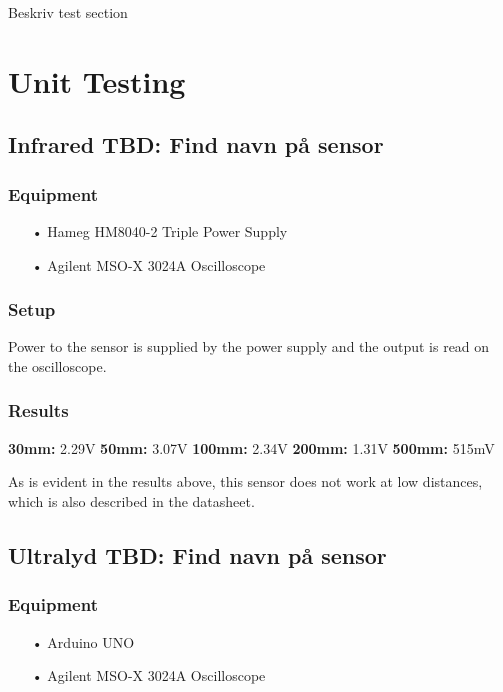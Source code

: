 Beskriv test section

\section{Unit Testing}

\subsection{Infrared TBD: Find navn på sensor}


\subsubsection{Equipment}
\begin{enumerate}
    \item[•]Hameg HM8040-2 Triple Power Supply
    \item[•]Agilent MSO-X 3024A Oscilloscope    
\end{enumerate}

\subsubsection{Setup}
Power to the sensor is supplied by the power supply and the output is read on the oscilloscope.

\subsubsection{Results}
\textbf{30mm:} 2.29V
\textbf{50mm:} 3.07V
\textbf{100mm:} 2.34V
\textbf{200mm:} 1.31V
\textbf{500mm:} 515mV

As is evident in the results above, this sensor does not work at low distances, which is also described in the datasheet.

\subsection{Ultralyd TBD: Find navn på sensor}


\subsubsection{Equipment}
\begin{enumerate}
    \item[•]Arduino UNO
    \item[•]Agilent MSO-X 3024A Oscilloscope    
\end{enumerate}

